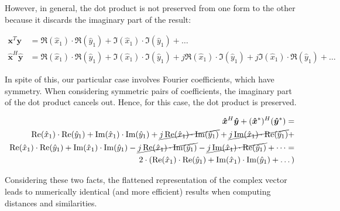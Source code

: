 \documentclass[../main.tex]{subfiles}
\begin{document}
However, in general, the dot product is not preserved from one form to the other because it discards the imaginary part of the result:

\begin{align}
    \bm{x}^T\bm{y} &= \Re(\hat{x}_1) \cdot \Re(\hat{y}_1) + \Im(\hat{x}_1) \cdot \Im(\hat{y}_1) + \dots\\
    \bm{\hat{x}}^H\bm{\hat{y}} &= \Re(\hat{x}_1) \cdot \Re(\hat{y}_1) + \Im(\hat{x}_1) \cdot \Im(\hat{y}_1) + j \Re(\hat{x}_1) \cdot \Im(\hat{y}_1) + j\Im(\hat{x}_1) \cdot \Re(\hat{y}_1) + \dots
\end{align}

In spite of this, our particular case involves Fourier coefficients, which have symmetry. When considering symmetric pairs of coefficients, the imaginary part of the dot product cancels out. Hence, for this case, the dot product is preserved.

\begin{equation}
\begin{split}
    \bm{\hat{x}}^H\bm{\hat{y}} + (\bm{\hat{x}}^*)^H(\bm{\hat{y}}^*) =\\
    \Re(\hat{x}_1) \cdot \Re(\hat{y}_1) + \Im(\hat{x}_1) \cdot \Im(\hat{y}_1) + \cancel{j \Re(\hat{x}_1) \cdot \Im(\hat{y}_1)} + \cancel{j\Im(\hat{x}_1) \cdot \Re(\hat{y}_1)} +\\ 
    \Re(\hat{x}_1) \cdot \Re(\hat{y}_1) + \Im(\hat{x}_1) \cdot \Im(\hat{y}_1) - \cancel{j \Re(\hat{x}_1) \cdot \Im(\hat{y}_1)} - \cancel{j\Im(\hat{x}_1) \cdot \Re(\hat{y}_1)} + \dots =\\ 
    2 \cdot (\Re(\hat{x}_1) \cdot \Re(\hat{y}_1) + \Im(\hat{x}_1) \cdot \Im(\hat{y}_1) + \dots)
\end{split}
\end{equation}

Considering these two facts, the flattened representation of the complex vector leads to numerically identical (and more efficient) results when computing distances and similarities.
\end{document}
